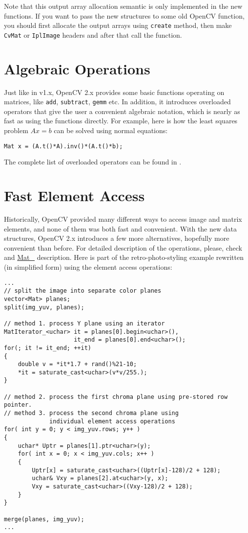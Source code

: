 Note that this output array allocation semantic is only implemented in the new functions. If you want to pass the new structures to some old OpenCV function, you should first allocate the output arrays using \texttt{create} method, then make \texttt{CvMat} or \texttt{IplImage} headers and after that call the function.

\section{Algebraic Operations}

Just like in v1.x, OpenCV 2.x provides some basic functions operating on matrices, like \texttt{add},
\texttt{subtract}, \texttt{gemm} etc. In addition, it introduces overloaded operators that give the user a convenient
algebraic notation, which is nearly as fast as using the functions directly. For example, here is how the least squares problem $Ax=b$
can be solved using normal equations:
\begin{lstlisting}
Mat x = (A.t()*A).inv()*(A.t()*b);
\end{lstlisting}

The complete list of overloaded operators can be found in .

\section{Fast Element Access}

Historically, OpenCV provided many different ways to access image and matrix elements, and none of them was both fast and convenient.
With the new data structures, OpenCV 2.x introduces a few more alternatives, hopefully more convenient than before. For detailed description of the operations, please, check  and \hyperref[MatT]{Mat\_} description. Here is part of the retro-photo-styling example rewritten (in simplified form) using the element access operations:

\begin{lstlisting}
...
// split the image into separate color planes
vector<Mat> planes;
split(img_yuv, planes);

// method 1. process Y plane using an iterator
MatIterator_<uchar> it = planes[0].begin<uchar>(),
                    it_end = planes[0].end<uchar>();
for(; it != it_end; ++it)
{
    double v = *it*1.7 + rand()%21-10;
    *it = saturate_cast<uchar>(v*v/255.);
}

// method 2. process the first chroma plane using pre-stored row pointer.
// method 3. process the second chroma plane using
             individual element access operations
for( int y = 0; y < img_yuv.rows; y++ )
{
    uchar* Uptr = planes[1].ptr<uchar>(y);
    for( int x = 0; x < img_yuv.cols; x++ )
    {
        Uptr[x] = saturate_cast<uchar>((Uptr[x]-128)/2 + 128);
        uchar& Vxy = planes[2].at<uchar>(y, x);
        Vxy = saturate_cast<uchar>((Vxy-128)/2 + 128);
    }
}

merge(planes, img_yuv);
...
\end{lstlisting}



